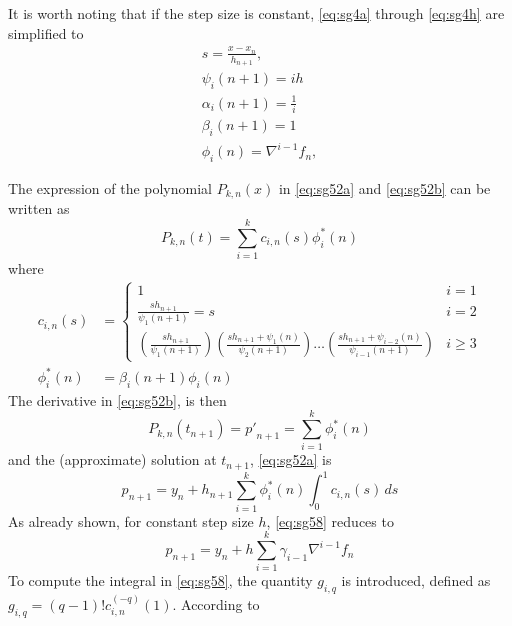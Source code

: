 It is worth noting that if the step size is constant, \autoref{eq:sg4a} through 
\autoref{eq:sg4h} are simplified to
\begin{gather}
  s = \frac{x-x_n}{h_{n+1}} , \label{eq:sg4Ab}\\
  \psi _i (n+1)   = ih \label{eq:sg4Ac}\\
  \alpha _i (n+1) = \frac{1}{i} \label{eq:sg4Ad}\\
  \beta_i (n+1)   = 1 \label{eq:sg4Ae}\\
  \phi _i(n)      = \nabla ^{i-1} f_n, \label{eq:sg4g}
\end{gather}

The expression of the polynomial $P_{k,n}(x)$ in \autoref{eq:sg52a} and \autoref{eq:sg52b} 
can be written as
\begin{equation}\label{eq:sq57}
  P_{k,n}(t) = \sum_{i=1}^{k} c_{i,n} (s) \phi ^{*}_{i}(n)
\end{equation}
where
\begin{align}
  c_{i,n}(s) &= \begin{cases}
    1                                    & i=1 \\
    \frac{s h_{n+1}}{\psi _1 (n+1)} = s  & i=2 \\
    \left(\frac{sh_{n+1}}{\psi _1(n+1)}\right)
    \left(\frac{sh_{n+1} + \psi _1(n)}{\psi _2(n+1)}\right)
    \dots
    \left(\frac{sh_{n+1} + \psi _{i-2}(n)}{\psi _{i-1}(n+1)}\right) & i \ge 3
  \end{cases}
  \label{eq:sg56} \\
  \phi ^{*}_{i}(n) &= \beta _i (n+1) \phi _i (n) \label{eq:sg56b}
\end{align}
The derivative in \autoref{eq:sg52b}, is then
\begin{equation}\label{eq:sg57b}
   P_{k,n}(t_{n+1}) = {p'}_{n+1} = \sum_{i=1}^{k} \phi ^{*}_{i}(n)
\end{equation}
and the (approximate) solution at $t_{n+1}$, \autoref{eq:sg52a} is
\begin{equation}\label{eq:sg58}
  p_{n+1} = y_n + h_{n+1} \sum_{i=1}^{k} \phi ^{*}_{i}(n) \int_{0}^{1} c_{i,n}(s) \,ds
\end{equation}
As already shown, for constant step size $h$, \autoref{eq:sg58} reduces to
\begin{equation}\label{eq:sg58b}
  p_{n+1} = y_n + h \sum_{i=1}^{k} \gamma _{i-1} \nabla ^{i-1} f_n 
\end{equation}
To compute the integral in \autoref{eq:sg58}, the quantity $g_{i,q}$ is 
introduced, defined as $g_{i,q} = (q-1)! c_{i,n}^{(-q)}(1)$. According to 
